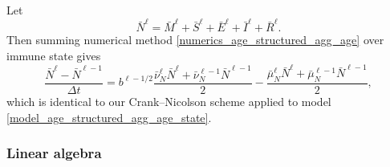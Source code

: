 \documentclass{jpmarticle}
\begin{document}
Let
\begin{equation}
  \bar{N}^{\ell}
  = \bar{M}^{\ell} + \bar{S}^{\ell} + \bar{E}^{\ell}
 + \bar{I}^{\ell} + \bar{R}^{\ell}.
\end{equation}
Then summing numerical method
\eqref{numerics_age_structured_agg_age} over immune state gives
\begin{equation}
  \label{numerics_age_structured_agg_age_state}
  \frac{\bar{N}^{\ell} - \bar{N}^{\ell - 1}}{\Delta t}
  = b^{\ell - 1 / 2}
  \frac{\bar{\nu}_N^{\ell} \bar{N}^{\ell}
  + \bar{\nu}_N^{\ell - 1} \bar{N}^{\ell - 1}}{2}
  - \frac{\bar{\mu}_N^{\ell} \bar{N}^{\ell}
  + \bar{\mu}_N^{\ell - 1} \bar{N}^{\ell - 1}}{2},
\end{equation}
which is identical to our Crank--Nicolson scheme applied to model
\eqref{model_age_structured_agg_age_state}.


\subsubsection{Linear algebra}
\end{document}
